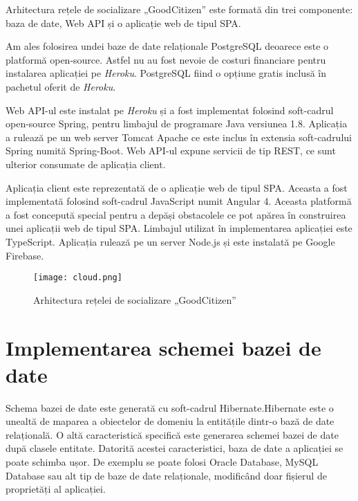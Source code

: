 Arhitectura rețele de socializare „GoodCitizen” este formată din trei 
componente: baza de date, Web API și o aplicație web de tipul SPA. 

Am ales folosirea undei baze de date relaționale PostgreSQL deoarece 
este o platformă open-source. Astfel nu au fost nevoie de costuri financiare
pentru instalarea aplicației pe \textit{Heroku}. PostgreSQL fiind o opțiune gratis inclusă
în pachetul oferit de \textit{Heroku}.

Web API-ul este instalat pe \textit{Heroku} și a fost implementat folosind soft-cadrul open-source Spring, pentru limbajul de programare 
Java versiunea 1.8. Aplicația a rulează pe un web server Tomcat Apache ce este inclus în extensia soft-cadrului 
Spring numită Spring-Boot. Web API-ul expune servicii de tip REST, ce sunt ulterior consumate de aplicația client.

Aplicația client este reprezentată de o aplicație web de tipul SPA. Aceasta a fost implementată folosind soft-cadrul
JavaScript numit Angular 4. Aceasta platformă a fost concepută special pentru a depăși obstacolele ce pot apărea 
în construirea unei aplicații web de tipul SPA. Limbajul utilizat în implementarea aplicației este TypeScript. 
Aplicația rulează 
pe un server Node.js și este instalată pe Google Firebase.

\begin{figure}[h]
\texttt{[image: cloud.png]}
\centering
\caption{Arhitectura rețelei de socializare „GoodCitizen”}
\label{fig:cloud}
\end{figure}    

\section{Implementarea schemei bazei de date}
    Schema bazei de date este generată cu soft-cadrul Hibernate.Hibernate este o unealtă de maparea a obiectelor de 
domeniu la entitățile dintr-o bază de date relațională. O altă caracteristică specifică este generarea schemei bazei de date 
după clasele entitate. Datorită acestei caracteristici, baza de date a aplicației se poate schimba ușor. De exemplu 
se poate folosi Oracle Database, MySQL Database sau alt tip de baze de date relaționale, modificând doar 
fișierul de proprietăți al aplicației. 

